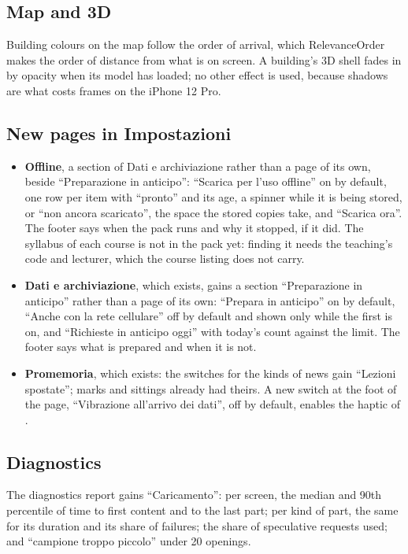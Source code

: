 \subsection{Map and 3D}
Building colours on the map follow the order of arrival, which RelevanceOrder makes
the order of distance from what is on screen. A building's 3D shell fades in by
opacity when its model has loaded; no other effect is used, because shadows are
what costs frames on the iPhone 12 Pro.

\subsection{New pages in Impostazioni}
\begin{itemize}
  \item \textbf{Offline}, a section of Dati e archiviazione rather than a page of its own, beside ``Preparazione in anticipo'': ``Scarica per l'uso offline'' on by default, one row per item with ``pronto'' and its age, a spinner while it is being stored, or ``non ancora scaricato'', the space the stored copies take, and ``Scarica ora''. The footer says when the pack runs and why it stopped, if it did. The syllabus of each course is not in the pack yet: finding it needs the teaching's code and lecturer, which the course listing does not carry.
  \item \textbf{Dati e archiviazione}, which exists, gains a section ``Preparazione in anticipo'' rather than a page of its own: ``Prepara in anticipo'' on by default, ``Anche con la rete cellulare'' off by default and shown only while the first is on, and ``Richieste in anticipo oggi'' with today's count against the limit. The footer says what is prepared and when it is not.
  \item \textbf{Promemoria}, which exists: the switches for the kinds of news gain ``Lezioni spostate''; marks and sittings already had theirs. A new switch at the foot of the page, ``Vibrazione all'arrivo dei dati'', off by default, enables the haptic of .
\end{itemize}

\subsection{Diagnostics}
The diagnostics report gains ``Caricamento'': per screen, the median and 90th
percentile of time to first content and to the last part; per kind of part, the
same for its duration and its share of failures; the share of speculative requests
used; and ``campione troppo piccolo'' under 20 openings.
